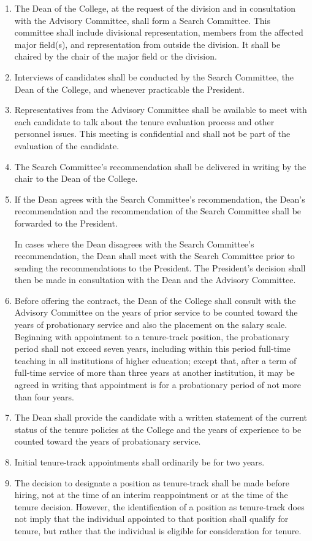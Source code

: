 \documentclass{manual}
\newcommand{\itemLevelA}{\alph*.}
\newcommand{\itemRefA}{\alph*}
\begin{document}
				\begin{enumerate}[label=\itemLevelA,ref=\itemRefA]
				\item The Dean of the College, at the request of the division and in consultation with the Advisory Committee, shall form a Search Committee. This committee shall include divisional representation, members from the affected major field(s), and representation from outside the division. It shall be chaired by the chair of the major field or the division.
				\item Interviews of candidates shall be conducted by the Search Committee, the Dean of the College, and whenever practicable the President.
				\item Representatives from the Advisory Committee shall be available to meet with each candidate to talk about the tenure evaluation process and other personnel issues. This meeting is confidential and shall not be part of the evaluation of the candidate.
				\item The Search Committee's recommendation shall be delivered in writing by the chair to the Dean of the College.
				\item If the Dean agrees with the Search Committee's recommendation, the Dean's recommendation and the recommendation of the Search Committee shall be forwarded to the President.

					In cases where the Dean disagrees with the Search Committee's recommendation, the Dean shall meet with the Search Committee prior to sending the recommendations to the President. The President's decision shall then be made in consultation with the Dean and the Advisory Committee.
					
				\item Before offering the contract, the Dean of the College shall consult with the Advisory Committee on the years of prior service to be counted toward the years of probationary service and also the placement on the salary scale. Beginning with appointment to a tenure-track position, the probationary period shall not exceed seven years, including within this period full-time teaching in all institutions of higher education; except that, after a term of full-time service of more than three years at another institution, it may be agreed in writing that appointment is for a probationary period of not more than four years.
				\item The Dean shall provide the candidate with a written statement of the current status of the tenure policies at the College and the years of experience to be counted toward the years of probationary service.
				\item Initial tenure-track appointments shall ordinarily be for two years.
				\item The decision to designate a position as tenure-track shall be made before hiring, not at the time of an interim reappointment or at the time of the tenure decision. However, the identification of a position as tenure-track does not imply that the individual appointed to that position shall qualify for tenure, but rather that the individual is eligible for consideration for tenure.
				\end{enumerate}
\end{document}
